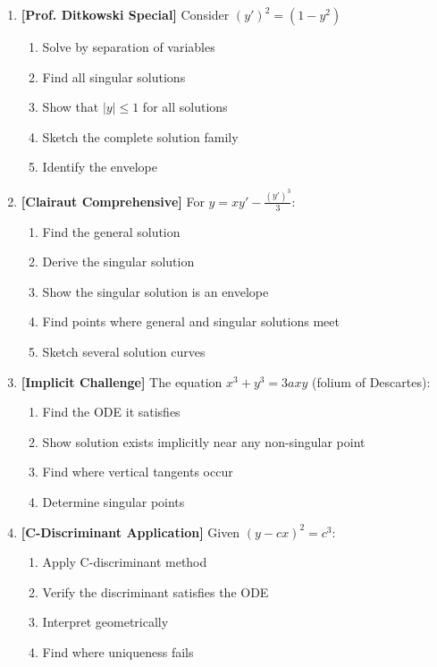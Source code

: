 \documentclass[12pt]{article}
\begin{document}
\begin{enumerate}[resume]
\item \textbf{[Prof. Ditkowski Special]} Consider $(y')^2 = (1 - y^2)$
    \begin{enumerate}
        \item Solve by separation of variables
        \item Find all singular solutions
        \item Show that $|y| \leq 1$ for all solutions
        \item Sketch the complete solution family
        \item Identify the envelope
    \end{enumerate}

\item \textbf{[Clairaut Comprehensive]} For $y = xy' - \frac{(y')^3}{3}$:
    \begin{enumerate}
        \item Find the general solution
        \item Derive the singular solution
        \item Show the singular solution is an envelope
        \item Find points where general and singular solutions meet
        \item Sketch several solution curves
    \end{enumerate}

\item \textbf{[Implicit Challenge]} The equation $x^3 + y^3 = 3axy$ (folium of Descartes):
    \begin{enumerate}
        \item Find the ODE it satisfies
        \item Show solution exists implicitly near any non-singular point
        \item Find where vertical tangents occur
        \item Determine singular points
    \end{enumerate}

\item \textbf{[C-Discriminant Application]} Given $(y - cx)^2 = c^3$:
    \begin{enumerate}
        \item Apply C-discriminant method
        \item Verify the discriminant satisfies the ODE
        \item Interpret geometrically
        \item Find where uniqueness fails
    \end{enumerate}


\end{enumerate}
\end{document}
